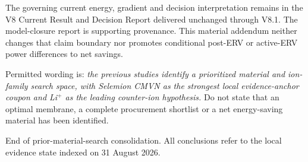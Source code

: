 \documentclass[10pt,a4paper]{article}
\begin{document}
The governing current energy, gradient and decision interpretation remains in
the V8 Current Result and Decision Report delivered unchanged through V8.1.
The model-closure report is supporting provenance. This material addendum
neither changes that claim boundary nor promotes conditional post-ERV or
active-ERV power differences to net savings.

\begin{stopbox}
Permitted wording is: \emph{the previous studies identify a prioritized
material and ion-family search space, with Selemion CMVN as the strongest local
evidence-anchor coupon and Li$^+$ as the leading counter-ion hypothesis.}
Do not state that an optimal membrane, a complete procurement shortlist or a
net energy-saving material has been identified.
\end{stopbox}

\vfill
{\sffamily\scriptsize\color{Slate}
End of prior-material-search consolidation. All conclusions refer to the local
evidence state indexed on 31 August 2026.}
\end{document}

